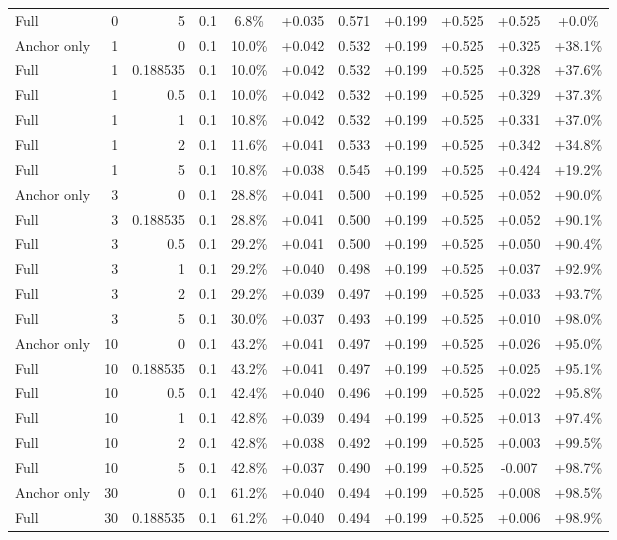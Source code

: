 \begin{table}[htbp]
\begin{tabular}{lrrrccccccc}
Full & 0 & 5 & 0.1 & 6.8\% & +0.035 & 0.571 & +0.199 & +0.525 & +0.525 & +0.0\% \\
Anchor only & 1 & 0 & 0.1 & 10.0\% & +0.042 & 0.532 & +0.199 & +0.525 & +0.325 & +38.1\% \\
Full & 1 & 0.188535 & 0.1 & 10.0\% & +0.042 & 0.532 & +0.199 & +0.525 & +0.328 & +37.6\% \\
Full & 1 & 0.5 & 0.1 & 10.0\% & +0.042 & 0.532 & +0.199 & +0.525 & +0.329 & +37.3\% \\
Full & 1 & 1 & 0.1 & 10.8\% & +0.042 & 0.532 & +0.199 & +0.525 & +0.331 & +37.0\% \\
Full & 1 & 2 & 0.1 & 11.6\% & +0.041 & 0.533 & +0.199 & +0.525 & +0.342 & +34.8\% \\
Full & 1 & 5 & 0.1 & 10.8\% & +0.038 & 0.545 & +0.199 & +0.525 & +0.424 & +19.2\% \\
Anchor only & 3 & 0 & 0.1 & 28.8\% & +0.041 & 0.500 & +0.199 & +0.525 & +0.052 & +90.0\% \\
Full & 3 & 0.188535 & 0.1 & 28.8\% & +0.041 & 0.500 & +0.199 & +0.525 & +0.052 & +90.1\% \\
Full & 3 & 0.5 & 0.1 & 29.2\% & +0.041 & 0.500 & +0.199 & +0.525 & +0.050 & +90.4\% \\
Full & 3 & 1 & 0.1 & 29.2\% & +0.040 & 0.498 & +0.199 & +0.525 & +0.037 & +92.9\% \\
Full & 3 & 2 & 0.1 & 29.2\% & +0.039 & 0.497 & +0.199 & +0.525 & +0.033 & +93.7\% \\
Full & 3 & 5 & 0.1 & 30.0\% & +0.037 & 0.493 & +0.199 & +0.525 & +0.010 & +98.0\% \\
Anchor only & 10 & 0 & 0.1 & 43.2\% & +0.041 & 0.497 & +0.199 & +0.525 & +0.026 & +95.0\% \\
Full & 10 & 0.188535 & 0.1 & 43.2\% & +0.041 & 0.497 & +0.199 & +0.525 & +0.025 & +95.1\% \\
Full & 10 & 0.5 & 0.1 & 42.4\% & +0.040 & 0.496 & +0.199 & +0.525 & +0.022 & +95.8\% \\
Full & 10 & 1 & 0.1 & 42.8\% & +0.039 & 0.494 & +0.199 & +0.525 & +0.013 & +97.4\% \\
Full & 10 & 2 & 0.1 & 42.8\% & +0.038 & 0.492 & +0.199 & +0.525 & +0.003 & +99.5\% \\
Full & 10 & 5 & 0.1 & 42.8\% & +0.037 & 0.490 & +0.199 & +0.525 & -0.007 & +98.7\% \\
Anchor only & 30 & 0 & 0.1 & 61.2\% & +0.040 & 0.494 & +0.199 & +0.525 & +0.008 & +98.5\% \\
Full & 30 & 0.188535 & 0.1 & 61.2\% & +0.040 & 0.494 & +0.199 & +0.525 & +0.006 & +98.9\% \\

\end{tabular}
\end{table}
